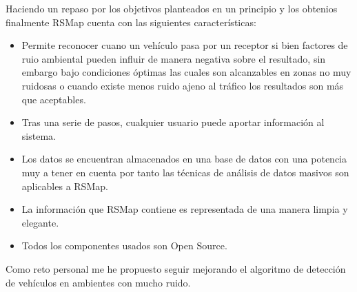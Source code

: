 \bigskip

Haciendo un repaso por los objetivos planteados en un principio y los obtenios finalmente RSMap cuenta con las siguientes características:

\begin{itemize}
\item Permite reconocer cuano un vehículo pasa por un receptor si bien factores de ruio ambiental pueden influir de manera negativa sobre el resultado, sin embargo bajo condiciones óptimas las cuales son alcanzables en zonas no muy ruidosas o cuando existe menos ruido ajeno al tráfico los resultados son más que aceptables.
\item Tras una serie de pasos, cualquier usuario puede aportar información al sistema.
\item Los datos se encuentran almacenados en una base de datos con una potencia muy a tener en cuenta por tanto las técnicas de análisis de datos masivos son aplicables a RSMap.
\item La información que RSMap contiene es representada de una manera limpia y elegante.
\item Todos los componentes usados son Open Source.
\end{itemize}

Como reto personal me he propuesto seguir mejorando el algoritmo de detección de vehículos en ambientes con mucho ruido.
